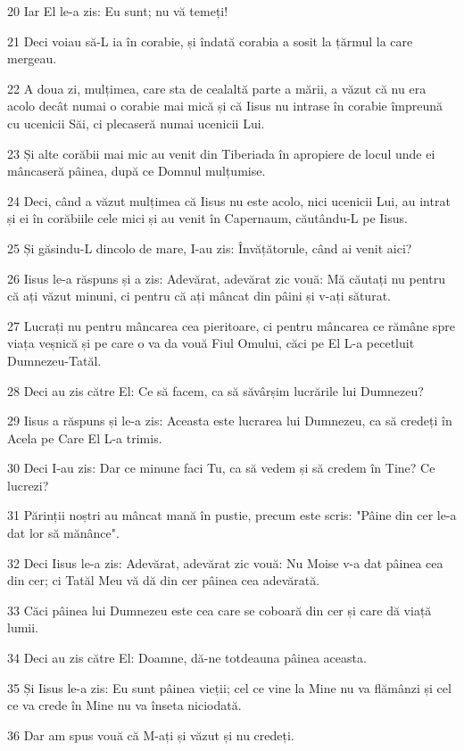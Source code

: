 \par 20 Iar El le-a zis: Eu sunt; nu vă temeți!
\par 21 Deci voiau să-L ia în corabie, și îndată corabia a sosit la țărmul la care mergeau.
\par 22 A doua zi, mulțimea, care sta de cealaltă parte a mării, a văzut că nu era acolo decât numai o corabie mai mică și că Iisus nu intrase în corabie împreună cu ucenicii Săi, ci plecaseră numai ucenicii Lui.
\par 23 Și alte corăbii mai mic au venit din Tiberiada în apropiere de locul unde ei mâncaseră pâinea, după ce Domnul mulțumise.
\par 24 Deci, când a văzut mulțimea că Iisus nu este acolo, nici ucenicii Lui, au intrat și ei în corăbiile cele mici și au venit în Capernaum, căutându-L pe Iisus.
\par 25 Și găsindu-L dincolo de mare, I-au zis: Învățătorule, când ai venit aici?
\par 26 Iisus le-a răspuns și a zis: Adevărat, adevărat zic vouă: Mă căutați nu pentru că ați văzut minuni, ci pentru că ați mâncat din pâini și v-ați săturat.
\par 27 Lucrați nu pentru mâncarea cea pieritoare, ci pentru mâncarea ce rămâne spre viața veșnică și pe care o va da vouă Fiul Omului, căci pe El L-a pecetluit Dumnezeu-Tatăl.
\par 28 Deci au zis către El: Ce să facem, ca să săvârșim lucrările lui Dumnezeu?
\par 29 Iisus a răspuns și le-a zis: Aceasta este lucrarea lui Dumnezeu, ca să credeți în Acela pe Care El L-a trimis.
\par 30 Deci I-au zis: Dar ce minune faci Tu, ca să vedem și să credem în Tine? Ce lucrezi?
\par 31 Părinții noștri au mâncat mană în pustie, precum este scris: "Pâine din cer le-a dat lor să mănânce".
\par 32 Deci Iisus le-a zis: Adevărat, adevărat zic vouă: Nu Moise v-a dat pâinea cea din cer; ci Tatăl Meu vă dă din cer pâinea cea adevărată.
\par 33 Căci pâinea lui Dumnezeu este cea care se coboară din cer și care dă viață lumii.
\par 34 Deci au zis către El: Doamne, dă-ne totdeauna pâinea aceasta.
\par 35 Și Iisus le-a zis: Eu sunt pâinea vieții; cel ce vine la Mine nu va flămânzi și cel ce va crede în Mine nu va înseta niciodată.
\par 36 Dar am spus vouă că M-ați și văzut și nu credeți.
